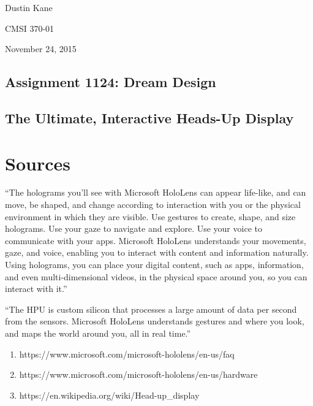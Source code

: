 \documentclass[a4paper,12pt]{article}
\begin{document}
Dustin Kane

CMSI 370-01

November 24, 2015

\begin{center}
\section*{Assignment 1124: Dream Design}
\subsection*{The Ultimate, Interactive Heads-Up Display}
\end{center}

\section{Sources}

``The holograms you’ll see with Microsoft HoloLens can appear life-like, and can move, be shaped, and change according to interaction with you or the physical environment in which they are visible. Use gestures to create, shape, and size holograms. Use your gaze to navigate and explore. Use your voice to communicate with your apps. Microsoft HoloLens understands your movements, gaze, and voice, enabling you to interact with content and information naturally. Using holograms, you can place your digital content, such as apps, information, and even multi-dimensional videos, in the physical space around you, so you can interact with it.''

``The HPU is custom silicon that processes a large amount of data per second from the sensors. Microsoft HoloLens understands gestures and where you look, and maps the world around you, all in real time.''
\begin{enumerate}
	\item https://www.microsoft.com/microsoft-hololens/en-us/faq
	\item https://www.microsoft.com/microsoft-hololens/en-us/hardware
	\item https://en.wikipedia.org/wiki/Head-up\_display
\end{enumerate}
\end{document}

